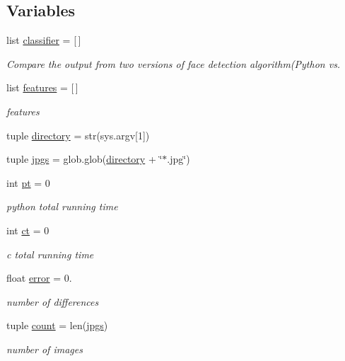 \subsection*{Variables}
\begin{DoxyCompactItemize}
\item 
list \hyperlink{namespacecompare_a2e7fcdc543e6a0fde614081764c7b5f8}{classifier} = \mbox{[}$\,$\mbox{]}
\begin{DoxyCompactList}\small\item\em Compare the output from two versions of face detection algorithm(Python vs. \end{DoxyCompactList}\item 
list \hyperlink{namespacecompare_a54c639c8b89bbd55f7362ec8285739bc}{features} = \mbox{[}$\,$\mbox{]}
\begin{DoxyCompactList}\small\item\em features \end{DoxyCompactList}\item 
tuple \hyperlink{namespacecompare_a7df7a3d32659e674d401b10b07fbfd4d}{directory} = str(sys.\+argv\mbox{[}1\mbox{]})
\item 
tuple \hyperlink{namespacecompare_a7506c3070e47d967e5139c47d0924ee1}{jpgs} = glob.\+glob(\hyperlink{namespacecompare_a7df7a3d32659e674d401b10b07fbfd4d}{directory} + \char`\"{}$\ast$.jpg\char`\"{})
\item 
int \hyperlink{namespacecompare_a003350551b423c4ce3833c717bb8157d}{pt} = 0
\begin{DoxyCompactList}\small\item\em python total running time \end{DoxyCompactList}\item 
int \hyperlink{namespacecompare_a99b344e9432b3e529d933a2b437096a3}{ct} = 0
\begin{DoxyCompactList}\small\item\em c total running time \end{DoxyCompactList}\item 
float \hyperlink{namespacecompare_afed0a531b3a338fe271715b204fb5d6f}{error} = 0.
\begin{DoxyCompactList}\small\item\em number of differences \end{DoxyCompactList}\item 
tuple \hyperlink{namespacecompare_aa6ed51fdf2d385739579bec3f610e8e7}{count} = len(\hyperlink{namespacecompare_a7506c3070e47d967e5139c47d0924ee1}{jpgs})
\begin{DoxyCompactList}\small\item\em number of images \end{DoxyCompactList}\item 

\end{DoxyCompactItemize}
